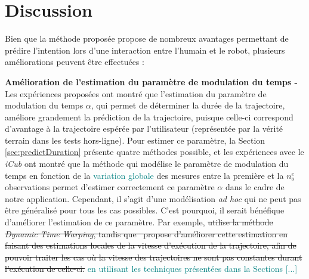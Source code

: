 \documentclass[utf8]{frontiersSCNS} %
\newcommand{\ori}[1]{\textcolor{teal}{#1}}
\newcommand{\toimprove}[1]{\textcolor{teal}{#1}}
\newcommand{\todo}[1]{\textcolor{red}{\textbf{/*#1*/}}}
\begin{document}
%


\section{Discussion} \label{sec:discussion}

Bien que la méthode proposée propose de nombreux avantages permettant de prédire l'intention  lors d'une interaction entre l'humain et le robot, plusieurs améliorations peuvent être effectuées :

\textbf{Amélioration de l'estimation du paramètre de modulation du temps -} Les expériences proposées ont montré que l'estimation du paramètre de modulation du temps $\alpha$, qui permet de déterminer la durée de la trajectoire, améliore grandement la prédiction de la trajectoire, puisque celle-ci correspond d'avantage à la trajectoire espérée par l'utilisateur (représentée par la vérité terrain dans les tests hors-ligne). Pour estimer ce paramètre, la Section \ref{sec:predictDuration} présente quatre méthodes possible, et les expériences avec le \textit{iCub} ont montré que la méthode qui modélise le paramètre de modulation du temps en fonction de la \toimprove{variation globale} des mesures entre la première et la $n_o^e$ observations 
permet d'estimer correctement ce paramètre $\alpha$ dans le cadre de notre application. Cependant, il s'agit d'une modélisation \textit{ad hoc} qui ne peut pas être généralisé pour tous les cas possibles. C'est pourquoi, il serait bénéfique d'améliorer l'estimation de ce paramètre.
Par exemple, \sout{\cite{maeda2016probabilistic} utilise la méthode \textit{Dynamic Time Warping}, tandis que~ \cite{ewerton2015learning} propose d'améliorer cette estimation en faisant des estimations locales de la vitesse d’exécution de la trajectoire, afin de pouvoir traiter les cas où la vitesse des trajectoires ne sont pas constantes durant l’exécution de celle-ci.} \ori{en utilisant les techniques présentées dans la Sections [...]} 
\end{document}

